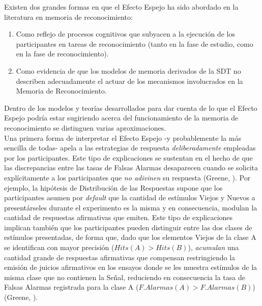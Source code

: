 Existen dos grandes formas en que el Efecto Espejo ha sido abordado en la literatura en memoria de reconocimiento:\\

\begin{enumerate}
\item Como reflejo de procesos cognitivos que subyacen a la ejecución de los participantes en tareas de reconocimiento (tanto en la fase de estudio, como en la fase de reconocimiento).\\

\item Como evidencia de que los modelos de memoria derivados de la SDT no describen adecuadamente el actuar de los mecanismos involucrados en la Memoria de Reconocimiento.\\
\end{enumerate}

Dentro de los modelos y teorías desarrollados para dar cuenta de lo que el Efecto Espejo podría estar sugiriendo acerca del funcionamiento de la memoria de reconocimiento se distinguen varias aproximaciones.\\

Una primera forma de interpretar el Efecto Espejo -y probablemente la más sencilla de todas- apela a las estrategias de respuesta \textit{deliberadamente} empleadas por los participantes. Este tipo de explicaciones se sustentan en el hecho de que las discrepancias entre las tasas de Falsas Alarmas desaparecen cuando se solicita explícitamente a los participantes que \textit{no adivinen} su respuesta (Greene, \citeyear{Greene1996}). Por ejemplo, la hipótesis de Distribución de las Respuestas supone que los participantes asumen por \textit{default} que la cantidad de estímulos Viejos y Nuevos a presentárseles durante el experimento es la misma y en consecuencia, modulan la cantidad de respuestas afirmativas que emiten. Este tipo de explicaciones implican también que los participantes pueden distinguir entre las dos clases de estímulos presentadas, de forma que, dado que los elementos Viejos de la clase A se identifican con mayor precisión ($Hits(A) > Hits(B)$), \textit{acumulan} una cantidad grande de respuestas afirmativas que compensan restringiendo la emisión de juicios afirmativos en los ensayos donde se les muestra estímulos de la misma clase que no contienen la Señal, reduciendo en consecuencia la tasa de Falsas Alarmas registrada para la clase A ($F.Alarmas(A) > F.Alarmas(B)$) (Greene, \citeyear{Greene1996}).\\

